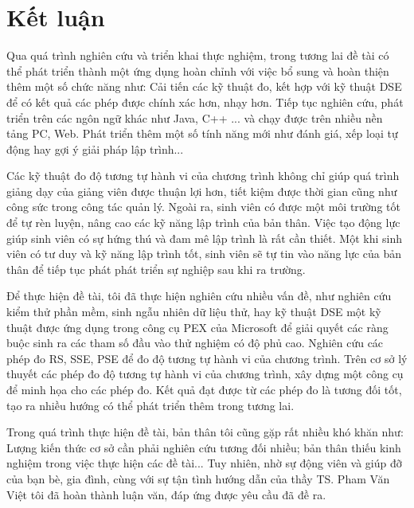 \section{Kết luận}
Qua quá trình nghiên cứu và triển khai thực nghiệm, trong tương lai đề
tài có thể phát triển thành một ứng dụng hoàn chỉnh với việc bổ
sung và hoàn thiện thêm một số chức năng như: Cải tiến các kỹ thuật đo, kết hợp với kỹ thuật DSE để có kết quả các phép được chính xác hơn, nhạy hơn. Tiếp tục nghiên cứu, phát triển trên các ngôn ngữ khác như Java, C++ ... và chạy được trên nhiều nền tảng PC, Web. Phát triển thêm một số tính năng mới như đánh giá, xếp loại tự động hay gợi ý giải pháp lập trình...

Các kỹ thuật đo độ tương tự hành vi của chương trình không chỉ giúp quá trình giảng dạy của giảng viên được thuận lợi hơn, tiết kiệm được thời gian cũng như công sức trong công tác quản lý. Ngoài ra, sinh viên có được một môi trường tốt để tự rèn luyện, nâng cao các kỹ năng lập trình của bản thân. Việc tạo động lực giúp sinh viên có sự hứng thú và đam mê lập trình là rất cần
thiết. Một khi sinh viên có tư duy và kỹ năng lập trình tốt, sinh viên
sẽ tự tin vào năng lực của bản thân để tiếp tục phát phát triển sự
nghiệp sau khi ra trường.

Để thực hiện đề tài, tôi đã thực hiện nghiên cứu nhiều vấn đề, như nghiên cứu kiểm thử phần mềm, sinh ngẫu nhiên dữ liệu thử, hay kỹ thuật DSE một kỹ thuật
được ứng dụng trong công cụ PEX của Microsoft để giải quyết các ràng
buộc sinh ra các tham số đầu vào thử nghiệm có độ phủ cao. Nghiên cứu
các phép đo RS, SSE, PSE để đo độ tương tự hành vi của chương
trình. Trên cơ sở lý thuyết các phép đo độ tương tự hành vi của chương trình, xây dựng một công cụ để minh họa cho các phép đo. Kết quả đạt được từ các phép đo là tương đối tốt, tạo ra nhiều hướng có thể phát triển thêm trong tương lai.

Trong quá trình thực hiện đề tài, bản thân tôi cũng gặp rất nhiều
khó khăn như: Lượng kiến thức cơ sở cần phải nghiên cứu tương đối nhiều; bản thân thiếu kinh nghiệm trong việc thực hiện các đề tài... Tuy nhiên, nhờ sự động viên và giúp đỡ của bạn bè, gia đình, cùng với sự tận tình hướng dẫn của thầy TS. Pham Văn Việt tôi đã hoàn thành luận văn, đáp ứng được yêu cầu đã đề ra.


